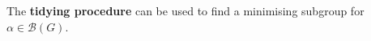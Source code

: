 \documentclass[preview]{standalone}
\begin{document}
The \textbf{tidying procedure} can be used to find a minimising subgroup for $\alpha \in \mathcal{B}(G)$.\\
\end{document}
